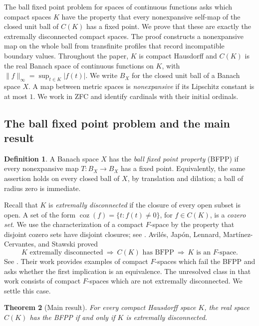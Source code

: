 \documentclass[preprint,12pt,nopreprintline]{elsarticle}
\newtheorem{theorem}{Theorem}[section]
\theoremstyle{definition}
\newtheorem{definition}[theorem]{Definition}
\theoremstyle{remark}
\numberwithin{equation}{section}
\begin{document}
The ball fixed point problem for spaces of continuous functions asks which compact spaces $K$ have the property that every nonexpansive self-map of the closed unit ball of $C(K)$ has a fixed point. We prove that these are exactly the extremally disconnected compact spaces. The proof constructs a nonexpansive map on the whole ball from transfinite profiles that record incompatible boundary values. Throughout the paper, $K$ is compact Hausdorff and $C(K)$ is the real Banach space of continuous functions on $K$, with $\|f\|_\infty=\sup_{t\in K}|f(t)|$. We write $B_X$ for the closed unit ball of a Banach space $X$. A map between metric spaces is \emph{nonexpansive} if its Lipschitz constant is at most $1$. We work in ZFC and identify cardinals with their initial ordinals.

\subsection{The ball fixed point problem and the main result}

\begin{definition}
A Banach space $X$ has the \emph{ball fixed point property} (BFPP) if every nonexpansive map $T:B_X\to B_X$ has a fixed point.
Equivalently, the same assertion holds on every closed ball of $X$, by translation and dilation; a ball of radius zero is immediate.
\end{definition}

Recall that $K$ is \emph{extremally disconnected} if the closure of every open subset is open. A set of the form
$\operatorname{coz}(f)=\{t:f(t)\ne0\}$, for $f\in C(K)$, is a \emph{cozero set}. We use the characterization of a compact
$F$-space by the property that disjoint cozero sets have disjoint closures; see \cite[Lemma~3.1]{AJLCS}. Avil\'es, Jap\'on, Lennard, Mart\'inez-Cervantes, and Stawski proved
\begin{equation}
 K\text{ extremally disconnected}
 \ \Longrightarrow\ C(K)\text{ has BFPP}
 \ \Longrightarrow\ K\text{ is an }F\text{-space}.
 \label{eq:known-implications}
\end{equation}
See \cite[Corollary~2.4 and Theorem~3.2]{AJLCS}. Their work provides examples of compact $F$-spaces which fail the
BFPP and asks whether the first implication is an equivalence. The unresolved class in that work consists of compact $F$-spaces
which are not extremally disconnected. We settle this case.

\begin{theorem}[Main result]
\label{thm:intro-main}
For every compact Hausdorff space $K$, the real space $C(K)$ has the BFPP if and only if $K$ is extremally disconnected.
\end{theorem}
\end{document}
